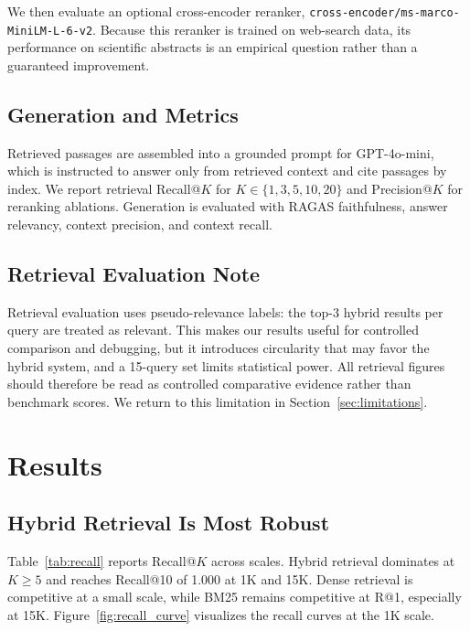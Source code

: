 \documentclass[11pt]{article}
\begin{document}
We then evaluate an optional cross-encoder reranker, \texttt{cross-encoder/ms-marco-\allowbreak{}MiniLM-L-6-v2}. Because this reranker is trained on web-search data, its performance on scientific abstracts is an empirical question rather than a guaranteed improvement.

\subsection{Generation and Metrics}

Retrieved passages are assembled into a grounded prompt for GPT-4o-mini, which is instructed to answer only from retrieved context and cite passages by index. We report retrieval Recall@$K$ for $K \in \{1,3,5,10,20\}$ and Precision@$K$ for reranking ablations. Generation is evaluated with RAGAS faithfulness, answer relevancy, context precision, and context recall.

\subsection{Retrieval Evaluation Note}
\label{sec:evalnote}

Retrieval evaluation uses pseudo-relevance labels: the top-3 hybrid results per query are treated as relevant. This makes our results useful for controlled comparison and debugging, but it introduces circularity that may favor the hybrid system, and a 15-query set limits statistical power. All retrieval figures should therefore be read as controlled comparative evidence rather than benchmark scores. We return to this limitation in Section~\ref{sec:limitations}.

\section{Results}

\subsection{Hybrid Retrieval Is Most Robust}

Table~\ref{tab:recall} reports Recall@$K$ across scales. Hybrid retrieval dominates at $K \geq 5$ and reaches Recall@10 of 1.000 at 1K and 15K. Dense retrieval is competitive at a small scale, while BM25 remains competitive at R@1, especially at 15K. Figure~\ref{fig:recall_curve} visualizes the recall curves at the 1K scale.
\end{document}
